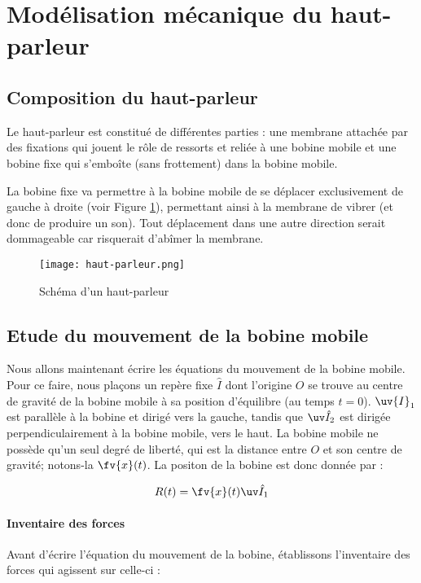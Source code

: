 

\section{Modélisation mécanique du haut-parleur}

\subsection{Composition du haut-parleur}
Le haut-parleur est constitué de différentes parties : une membrane
attachée par des fixations qui jouent le rôle de ressorts et reliée à 
une bobine mobile et une bobine fixe qui s'emboîte (sans frottement) 
dans la bobine mobile.

La bobine fixe va permettre à la bobine mobile de se déplacer exclusivement de gauche
à droite (voir Figure \ref{hp-scheme}), permettant ainsi à la membrane de vibrer 
(et donc de produire un son). Tout déplacement dans une autre direction serait dommageable
car risquerait d'abîmer la membrane.

\begin{figure}[ht!]
	\centering
	\texttt{[image: haut-parleur.png]}
	\caption{Schéma d'un haut-parleur}
	\label{hp-scheme}
\end{figure}

\subsection{Etude du mouvement de la bobine mobile}
Nous allons maintenant écrire les équations du mouvement de la bobine mobile.
Pour ce faire, nous plaçons un repère fixe $\hat{I}$ dont l'origine $O$ se trouve
au centre de gravité de la bobine mobile à sa position d'équilibre (au 
temps $t=0$). $\uv{I}_1$ est parallèle à la bobine et dirigé vers la gauche, tandis que
$\uv\hat{{I}}_2$ est dirigée perpendiculairement à la bobine mobile, vers le haut.
La bobine mobile ne possède qu'un seul degré de liberté, qui
est la distance entre $O$ et son centre de gravité; notons-la $\fv{x}(t)$.
La positon de la bobine est donc donnée par :

$$R(t) = \fv{x}(t) \uv \hat{{I}}_1$$ 

\paragraph{Inventaire des forces}
Avant d'écrire l'équation du mouvement de la bobine, établissons l'inventaire
des forces qui agissent sur celle-ci :

